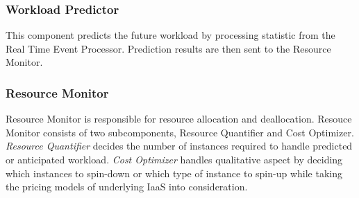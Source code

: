 \subsubsection{Workload Predictor}
This component predicts the future workload by processing statistic from the Real Time Event Processor. Prediction results are then sent to the Resource Monitor.

\subsubsection{Resource Monitor}
Resource Monitor is responsible for resource allocation and deallocation. Resouce Monitor consists of two subcomponents, Resource Quantifier and Cost Optimizer. \textit{Resource Quantifier} decides the number of instances required to handle predicted or anticipated workload. \textit{Cost Optimizer} handles qualitative aspect by deciding which instances to spin-down or which type of instance to spin-up while taking the pricing models of underlying IaaS into consideration.
